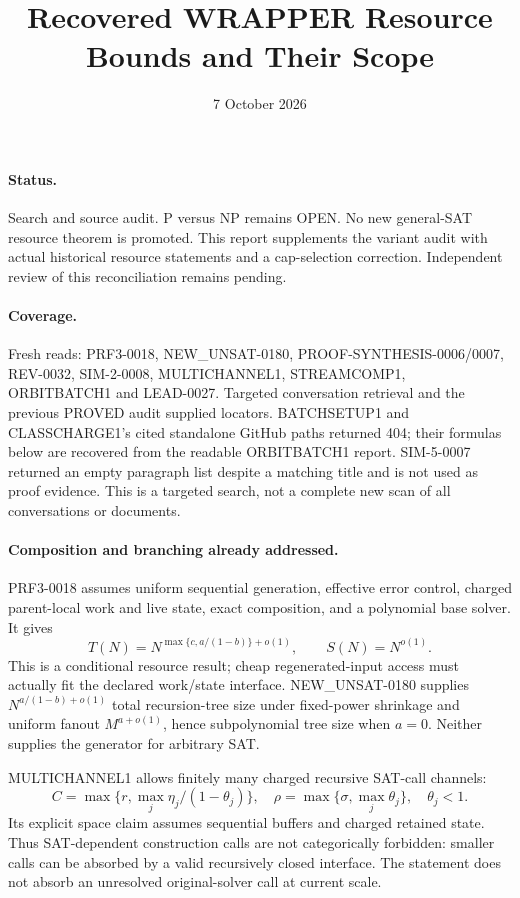 \documentclass[11pt]{article}
\title{Recovered WRAPPER Resource Bounds and Their Scope}
\date{7 October 2026}
\begin{document}
\maketitle
\paragraph{Status.} Search and source audit. P versus NP remains OPEN.
No new general-SAT resource theorem is promoted. This report supplements the
variant audit with actual historical resource statements and a cap-selection
correction. Independent review of this reconciliation remains pending.
\paragraph{Coverage.} Fresh reads: PRF3-0018, NEW\_UNSAT-0180,
PROOF-SYNTHESIS-0006/0007, REV-0032, SIM-2-0008, MULTICHANNEL1,
STREAMCOMP1, ORBITBATCH1 and LEAD-0027. Targeted conversation retrieval and
the previous PROVED audit supplied locators. BATCHSETUP1 and CLASSCHARGE1's
cited standalone GitHub paths returned 404; their formulas below are recovered
from the readable ORBITBATCH1 report. SIM-5-0007 returned an empty paragraph
list despite a matching title and is not used as proof evidence. This is a
targeted search, not a complete new scan of all conversations or documents.

\paragraph{Composition and branching already addressed.}
PRF3-0018 assumes uniform sequential generation, effective error control,
charged parent-local work and live state, exact composition, and a polynomial
base solver. It gives
\[
T(N)=N^{\max\{c,a/(1-b)\}+o(1)},\qquad S(N)=N^{o(1)}.
\]
This is a conditional resource result; cheap regenerated-input access must
actually fit the declared work/state interface. NEW\_UNSAT-0180 supplies
$N^{a/(1-b)+o(1)}$ total recursion-tree size under fixed-power shrinkage and
uniform fanout $M^{a+o(1)}$, hence subpolynomial tree size when $a=0$.
Neither supplies the generator for arbitrary SAT.

MULTICHANNEL1 allows finitely many charged recursive SAT-call channels:
\[
C=\max\{r,\max_j\eta_j/(1-\theta_j)\},\quad
\rho=\max\{\sigma,\max_j\theta_j\},\quad \theta_j<1.
\]
Its explicit space claim assumes sequential buffers and charged retained state.
Thus SAT-dependent construction calls are not categorically forbidden: smaller
calls can be absorbed by a valid recursively closed interface. The statement
does not absorb an unresolved original-solver call at current scale.
\end{document}
